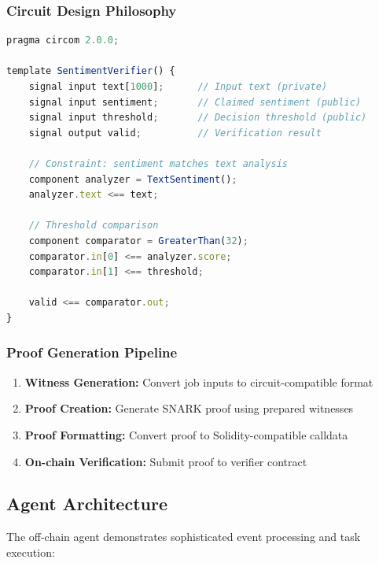 \subsubsection{Circuit Design Philosophy}
\begin{lstlisting}[language=JavaScript, caption=Sentiment analysis ZKP circuit structure]
pragma circom 2.0.0;

template SentimentVerifier() {
    signal input text[1000];      // Input text (private)
    signal input sentiment;       // Claimed sentiment (public)
    signal input threshold;       // Decision threshold (public)
    signal output valid;          // Verification result
    
    // Constraint: sentiment matches text analysis
    component analyzer = TextSentiment();
    analyzer.text <== text;
    
    // Threshold comparison
    component comparator = GreaterThan(32);
    comparator.in[0] <== analyzer.score;
    comparator.in[1] <== threshold;
    
    valid <== comparator.out;
}
\end{lstlisting}

\subsubsection{Proof Generation Pipeline}
\begin{enumerate}
    \item \textbf{Witness Generation:} Convert job inputs to circuit-compatible format
    \item \textbf{Proof Creation:} Generate SNARK proof using prepared witnesses
    \item \textbf{Proof Formatting:} Convert proof to Solidity-compatible calldata
    \item \textbf{On-chain Verification:} Submit proof to verifier contract
\end{enumerate}

\subsection{Agent Architecture}

The off-chain agent demonstrates sophisticated event processing and task execution:

